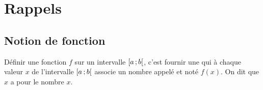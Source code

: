 \documentclass[12pt,a4paper]{article}
\date{}
\title{}
\begin{document}
	
	\section{Rappels}
	
	
	\subsection{Notion de fonction}
	
	\begin{mydef}
		
		Définir une fonction $f$ sur un intervalle $\mbox{\ensuremath{\left[a\mathpunct{};b\right[}}$, c'est fournir une  qui à chaque valeur $x$ de l'intervalle $\mbox{\ensuremath{\left[a\mathpunct{};b\right[}}$ associe un nombre appelé  et noté $f(x)$.
		On dit que $x$ a pour   le nombre $x$.
		
		
		
	\end{mydef}
	
\end{document}
